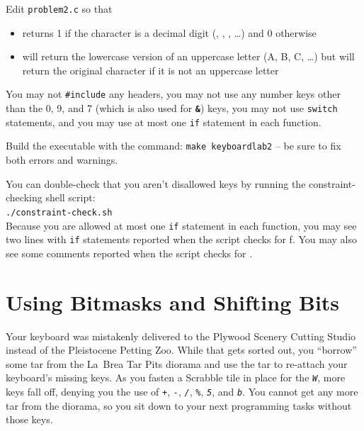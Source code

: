 Edit \texttt{problem2.c} so that
\begin{itemize}
\item {} returns 1 if the character is a decimal digit
    (\textquotesingle, \textquotesingle,
    \textquotesingle, \dots) and 0 otherwise
\item {} will return the lowercase version of an
    uppercase letter (\textquotesingle A\textquotesingle, \textquotesingle
    B\textquotesingle, \textquotesingle C\textquotesingle, \dots) but will
    return the original character if it is not an uppercase letter
\end{itemize}
You may not \lstinline{#include} any headers, you may not use any number keys
other than the 0, 9, and 7 (which is also used for \textbf{\texttt{\&}}) keys,
you may not use \lstinline{switch} statements, and you may use at most one
\lstinline{if} statement in each function.

Build the executable with the command: \texttt{make keyboardlab2} -- be sure to
fix both errors and warnings.

You can double-check that you aren't disallowed keys by running the
constraint-checking shell script: \\
\texttt{./constraint-check.sh} \\
Because you are allowed at most one \lstinline{if} statement in each function,
you may see two lines with \lstinline{if} statements reported when the script
checks for \textquotesingle f\textquotesingle. You may also see some comments
reported when the script checks for \textquotesingle *\textquotesingle.


\section{Using Bitmasks and Shifting Bits}

Your keyboard was mistakenly delivered to the Plywood Scenery Cutting Studio
instead of the Pleistocene Petting Zoo. While that gets sorted out, you
``borrow'' some tar from the La~Brea Tar Pits diorama and use the tar to
re-attach your keyboard's missing keys. As you fasten a Scrabble tile in place
for the \textit{\texttt{W}}, more keys fall off, denying you the use of
\textit{\texttt{+}}, \textit{\texttt{-}}, \textit{\texttt{/}},
\textit{\texttt{\%}}, \textit{\texttt{5}}, and \textit{\texttt{b}}. You cannot
get any more tar from the diorama, so you sit down to your next programming
tasks without those keys.

